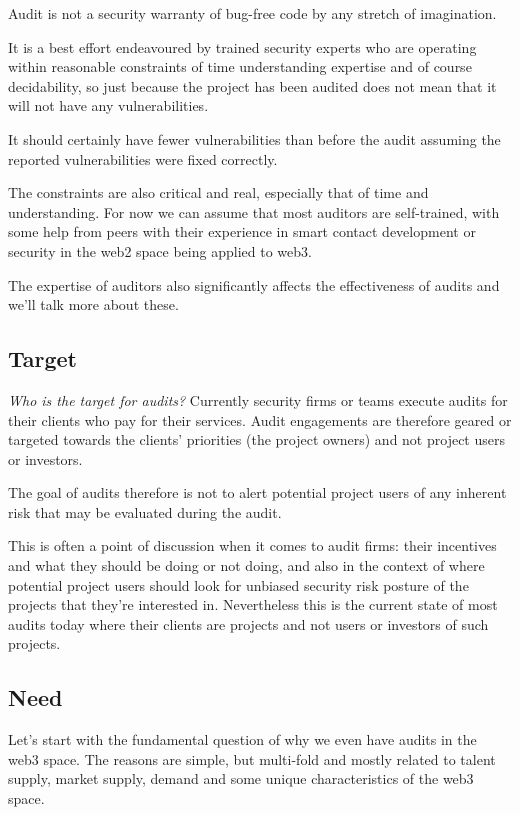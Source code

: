 Audit is not a security warranty of bug-free code by any stretch of
imagination.

It is a best effort endeavoured by trained security experts who are
operating within reasonable constraints of time understanding expertise
and of course decidability, so just because the project has been audited
does not mean that it will not have any vulnerabilities.

It should certainly have fewer vulnerabilities than before the audit
assuming the reported vulnerabilities were fixed correctly.

The constraints are also critical and real, especially that of time and
understanding. For now we can assume that most auditors are
self-trained, with some help from peers with their experience in smart
contact development or security in the web2 space being applied to web3.

The expertise of auditors also significantly affects the effectiveness
of audits and we'll talk more about these.

\subsection{Target}\label{target}

\emph{Who is the target for audits?} Currently security firms or teams
execute audits for their clients who pay for their services. Audit
engagements are therefore geared or targeted towards the clients'
priorities (the project owners) and not project users or investors.

The goal of audits therefore is not to alert potential project users of
any inherent risk that may be evaluated during the audit.

This is often a point of discussion when it comes to audit firms: their
incentives and what they should be doing or not doing, and also in the
context of where potential project users should look for unbiased
security risk posture of the projects that they're interested in.
Nevertheless this is the current state of most audits today where their
clients are projects and not users or investors of such projects.

\subsection{Need}\label{need}

Let's start with the fundamental question of why we even have audits in
the web3 space. The reasons are simple, but multi-fold and mostly
related to talent supply, market supply, demand and some unique
characteristics of the web3 space.

